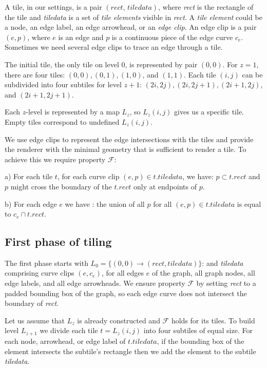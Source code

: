\documentclass{gd-llncs}
\begin{document}
{A tile, in our settings, is a pair $(\textit{rect, tiledata})$, where \textit{rect} is the rectangle of the tile and \textit{tiledata} is a set of \textit{tile elements} visible in \textit{rect}. A \textit{tile element} could be a node, an edge label, an edge arrowhead, or an \textit{edge clip}. An edge clip is a pair $(e, p)$, where $e$ is an edge and $p$ is a continuous piece of the edge curve $c_e$. Sometimes we need several edge clips to trace an edge through a tile.


The initial tile, the only tile on level $0$, is represented by pair $(0,0)$. For $z = 1$, there are four tiles: $(0,0),(0,1),(1,0)$, and $(1,1)$. Each tile $(i,j)$ can be subdivided into four subtiles for level $z+1$: $(2i,2j),(2i,2j+1), (2i+1,2j)$, and $(2i+1,2j+1)$.

Each $z$-level is represented by a map $L_z$, so $L_z(i, j)$ gives us a specific tile. Empty tiles correspond to undefined $L_z(i, j)$.

We use edge clips to represent the edge intersections with the tiles and provide the renderer with the minimal geometry that is sufficient to render a tile. To achieve this we require property $\mathcal{F}$:

a) For each tile $t$, for each curve clip $(e,p) \in t.\textit{tiledata}$, we have: $p \subset t.rect$ and $p$ might cross the boundary of the $t.rect$ only at endpoints of $p$.

b) For each edge $e$ we have : the union of all $p$ for all $(e,p) \in t.\textit{tiledata}$ is equal to $c_e \cap t.rect$.

\subsection*{First phase of tiling}

The first phase starts with $L_0 = \{(0,0) \rightarrow (\textit{rect},\textit{tiledata})\}$: and \textit{tiledata} comprising curve clips $(e,c_e)$, for all edges $e$ of the graph, all graph nodes, all edge labels, and all edge arrowheads. We ensure property $\mathcal{F}$ by setting \textit{rect} to a padded bounding box of the graph, so each edge curve does not intersect the boundary of \textit{rect}.

Let us assume that $L_z$ is already constructed and $\mathcal{F}$ holds for its tiles. To build level $L_{z+1}$ we divide each tile $t=L_z(i, j)$ into four subtiles of equal size. For each node, arrowhead, or edge label of $t.\textit{tiledata}$, if the bounding box of the element intersects the subtile's rectangle then we add the element to the subtile \textit{tiledata}.

}
\end{document}
